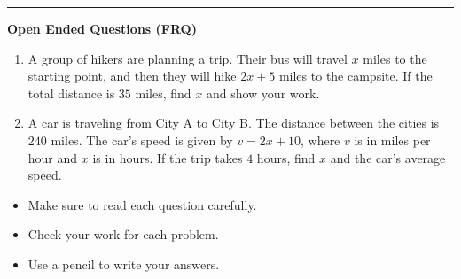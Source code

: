 \documentclass[10pt]{article}
\begin{document}
\vspace{-0.2cm}
\hrule
\vspace{0.2cm}
\textbf{\small Open Ended Questions (FRQ)}
\begin{enumerate}[label=\textbf{Q\arabic*.}, start=9, itemsep=5pt, topsep=0pt]

  \item \small A group of hikers are planning a trip. Their bus will travel $x$ miles to the starting point, and then they will hike $2x + 5$ miles to the campsite. If the total distance is $35$ miles, find $x$ and show your work. \vspace{2cm}

  \item \small A car is traveling from City A to City B. The distance between the cities is $240$ miles. The car's speed is given by $v = 2x + 10$, where $v$ is in miles per hour and $x$ is in hours. If the trip takes $4$ hours, find $x$ and the car's average speed. \vspace{2cm}

\end{enumerate}

\vfill

\begin{tcolorbox}[colback=blue!5, colframe=mainblue!50, title=\small \textbf{Chef's Tips}, fonttitle=\bfseries, bottom=1mm]
\begin{itemize}[noitemsep, topsep=2pt, leftmargin=0.5cm]
  \item \scriptsize Make sure to read each question carefully.\item \scriptsize Check your work for each problem.\item \scriptsize Use a pencil to write your answers.
\end{itemize}
\end{tcolorbox}
\end{document}
